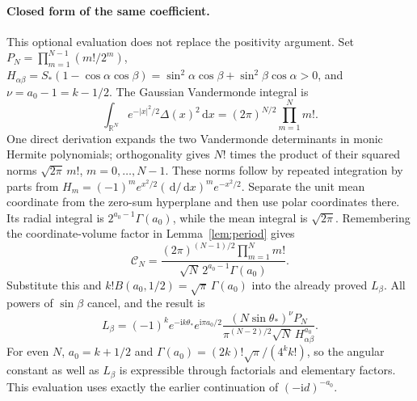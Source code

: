\documentclass[11pt]{article}
\numberwithin{equation}{section}
\theoremstyle{definition}
\newcommand{\dd}{\,\mathrm d}
\newcommand{\ii}{\mathrm i}
\newcommand{\R}{\mathbb R}
\begin{document}
\paragraph{Closed form of the same coefficient.}
This optional evaluation does not replace the positivity argument.
Set \(P_N=\prod_{m=1}^{N-1}(m!/2^m)\),
\(H_{\alpha\beta}=S_*(1-\cos\alpha\cos\beta)
=\sin^2\alpha\cos\beta+\sin^2\beta\cos\alpha>0\), and
\(\nu=a_0-1=k-1/2\). The Gaussian Vandermonde integral is
\[
 \int_{\R^N}e^{-|x|^2/2}\Delta(x)^2\dd x
 =(2\pi)^{N/2}\prod_{m=1}^N m!.
\]
One direct derivation expands the two Vandermonde determinants in
monic Hermite polynomials; orthogonality gives \(N!\) times the
product of their squared norms \(\sqrt{2\pi}\,m!\),
\(m=0,\ldots,N-1\). These norms follow by repeated integration by
parts from \(H_m=(-1)^me^{x^2/2}(\dd/\dd x)^me^{-x^2/2}\).
Separate the unit mean coordinate from the zero-sum hyperplane and
then use polar coordinates there. Its radial integral is
\(2^{a_0-1}\Gamma(a_0)\), while the mean integral is
\(\sqrt{2\pi}\). Remembering the coordinate-volume factor in
Lemma~\ref{lem:period} gives
\[
 \mathscr C_N=
 \frac{(2\pi)^{(N-1)/2}\prod_{m=1}^Nm!}
      {\sqrt N\,2^{a_0-1}\Gamma(a_0)}.
\]
Substitute this and
\(k!B(a_0,1/2)=\sqrt\pi\,\Gamma(a_0)\) into the already proved
\(L_\beta\). All powers of \(\sin\beta\) cancel, and the result is
\begin{equation}
 L_\beta=(-1)^k e^{-\ii k\theta_*}e^{\ii\pi a_0/2}
 \frac{(N\sin\theta_*)^{\nu}P_N}
 {\pi^{(N-2)/2}\sqrt N\,H_{\alpha\beta}^{a_0}}.
 \label{eq:amplitudeclosed}
\end{equation}
For even \(N\), \(a_0=k+1/2\) and
\(\Gamma(a_0)=(2k)!\sqrt\pi/(4^kk!)\), so the angular constant
as well as \(L_\beta\) is expressible through factorials and
elementary factors. This evaluation uses exactly the earlier
continuation of \((-\ii d)^{-a_0}\).



\end{document}
